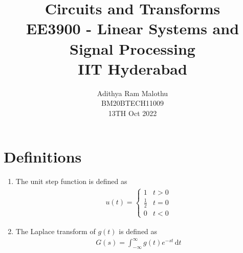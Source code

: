 \documentclass[journal,12pt,twocolumn]{IEEEtran}
\title{Circuits and Transforms \\ \Large EE3900 - Linear Systems and Signal Processing \\ \large IIT Hyderabad}
\author{Adithya Ram Malothu \\ \normalsize BM20BTECH11009 \\ \vspace*{20pt} \normalsize 13TH Oct 2022}
\providecommand{\der}[1]{\mathrm{d} #1}
\numberwithin{equation}{section}
\numberwithin{figure}{section}
\renewcommand\thesection{\arabic{section}}
\begin{document}
	\maketitle

	\section{Definitions}
	\begin{enumerate}[label=\thesection.\arabic*,ref=\thesection.\theenumi]
	\item The unit step function is defined as
	\begin{align}
		u(t) =
		\begin{cases}
			1 & t > 0 \\
			\frac{1}{2} & t = 0 \\
			0 & t < 0
		\end{cases}
	\end{align}
		
	\item The Laplace transform of $g(t)$ is defined as 
	\begin{align}
		G(s) = \int_{-\infty}^{\infty} g(t) e^{-st}\, \der{t}
	\end{align}
	\end{enumerate}
	
\end{document}
